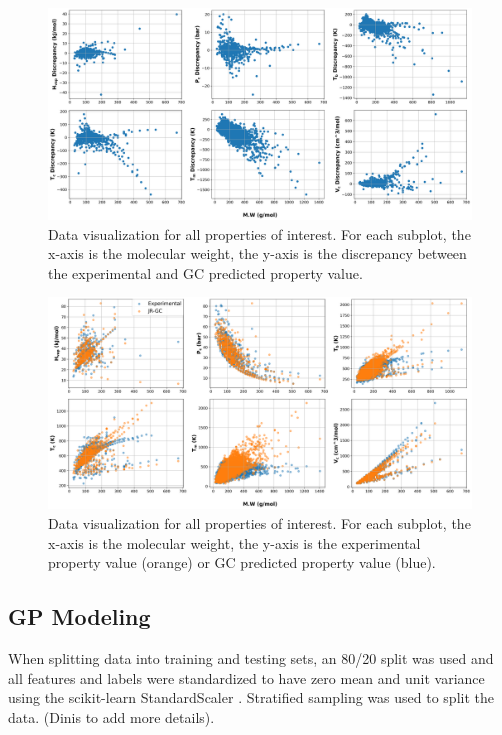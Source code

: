 \documentclass[journal=jacsat,manuscript=article]{achemso}
\begin{document}
\begin{figure}[H]
    \centering
    \includegraphics[width=\textwidth]{"./MW_vs_Disc.png"} %
    \caption{Data visualization for all properties of interest. For each subplot, the x-axis is the molecular weight, the y-axis is the discrepancy between the experimental and GC predicted property value.}
    \label{fig:Data_Vis_Disc}
\end{figure}

\begin{figure}[H] %
    \centering
    \includegraphics[width=\textwidth]{"./MW_vs_Prop.png"} %
    \caption{Data visualization for all properties of interest. For each subplot, the x-axis is the molecular weight, the y-axis is the experimental property value (orange) or GC predicted property value (blue).}
    \label{fig:Data_Vis_Prop}
\end{figure}



\subsection{GP Modeling}
When splitting data into training and testing sets, an 80/20 split was used and all features and labels were standardized to have zero mean and unit variance using the scikit-learn StandardScaler \cite{scikit-learn} . Stratified sampling was used to split the data. (Dinis to add more details).
\end{document}
